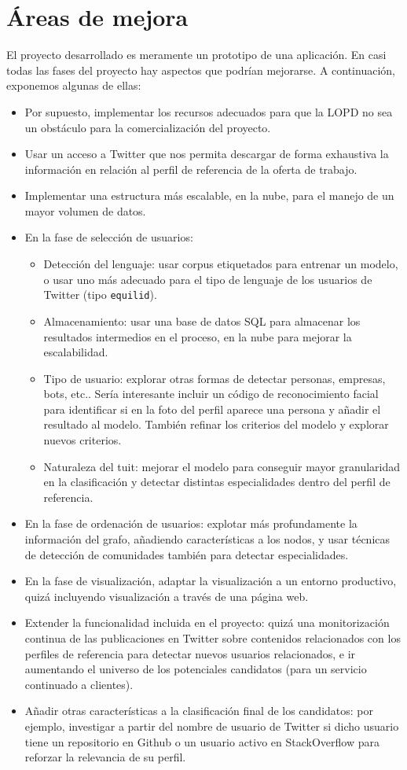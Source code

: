 \chapter{\'Areas de mejora}

El proyecto desarrollado es meramente un prototipo de una aplicación.
En casi todas las fases del proyecto hay aspectos que podrían
mejorarse. A continuación, exponemos algunas de ellas:
\begin{itemize} 
\item Por supuesto, implementar los recursos adecuados para que la 
LOPD no sea un obstáculo para la comercialización del proyecto.
\item Usar un acceso a Twitter que nos permita descargar de forma exhaustiva
la información en relación al perfil de referencia de la oferta de trabajo.
\item Implementar una estructura más escalable, en la nube,
para el manejo de un mayor volumen de datos.
\item En la fase de selección de usuarios:
\begin{itemize}
\item Detección del lenguaje: usar corpus etiquetados para entrenar un modelo,
o usar uno más adecuado para el tipo de lenguaje de los usuarios de Twitter 
(tipo {\tt equilid}).
\item Almacenamiento: usar una base de datos SQL para almacenar los resultados 
intermedios en el proceso, en la nube para mejorar la escalabilidad.
\item Tipo de usuario: explorar otras formas de detectar personas, empresas, bots, etc.. 
Sería interesante incluir un código de reconocimiento facial para identificar si en la foto 
del perfil aparece una persona y añadir el resultado al modelo. También refinar los 
criterios del modelo y explorar nuevos criterios.
\item Naturaleza del tuit: mejorar el modelo para conseguir mayor granularidad en
la clasificación y detectar distintas especialidades dentro del perfil de referencia.
\end{itemize} 
\item En la fase de ordenación de usuarios: explotar más profundamente la información
del grafo, añadiendo características a los nodos, y usar técnicas de detección de comunidades
también para detectar especialidades.
\item En la fase de visualización, adaptar la visualización a un entorno productivo,
quizá incluyendo visualización a través de una página web.
\item Extender la funcionalidad incluida en el proyecto: quizá una monitorización
continua de las publicaciones en Twitter sobre contenidos relacionados con los perfiles de 
referencia para detectar nuevos usuarios relacionados, e ir aumentando el universo de los 
potenciales candidatos (para un servicio continuado a clientes).
\item Añadir otras características a la clasificación final de los candidatos: por ejemplo,
investigar a partir del nombre de usuario de Twitter si dicho usuario tiene un repositorio en 
Github o un usuario activo en StackOverflow para reforzar la relevancia de su perfil.
\end{itemize} 

